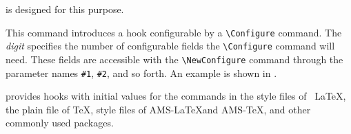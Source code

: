 is designed for this purpose. 

This command introduces a hook configurable by a \verb|\Configure| command. 
The \emph{digit} specifies the number of configurable fields the \verb|\Configure| command 
will need. These fields are accessible with the \verb|\NewConfigure| command through 
the parameter names \verb|#1|, \verb|#2|, and so forth. An example is shown in . 

\texht provides hooks with initial values for the commands in the style
files of \ \LaTeX, the plain file of \TeX, style files of AMS-\LaTeX and
AMS-\TeX, and other commonly used packages. 
